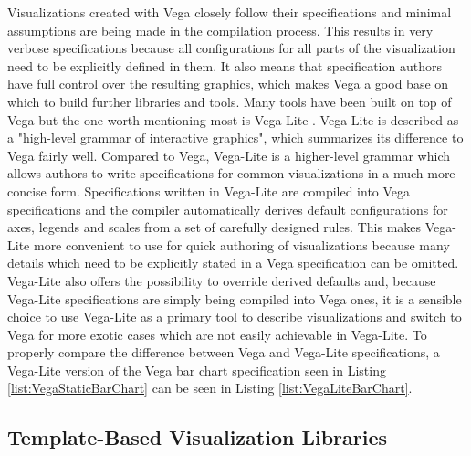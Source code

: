 Visualizations created with Vega closely follow their specifications and minimal assumptions are being made in the compilation process. This results in very verbose specifications because all configurations for all parts of the visualization need to be explicitly defined in them. It also means that specification authors have full control over the resulting graphics, which makes Vega a good base on which to build further libraries and tools. Many tools \parencite{Voyager,Lyra,CompassQL} have been built on top of Vega but the one worth mentioning most is Vega-Lite \parencite{VegaLite}. Vega-Lite is described as a "high-level grammar of interactive graphics", which summarizes its difference to Vega fairly well. Compared to Vega, Vega-Lite is a higher-level grammar which allows authors to write specifications for common visualizations in a much more concise form. Specifications written in Vega-Lite are compiled into Vega specifications and the compiler automatically derives default configurations for axes, legends and scales from a set of carefully designed rules. This makes Vega-Lite more convenient to use for quick authoring of visualizations because many details which need to be explicitly stated in a Vega specification can be omitted. Vega-Lite also offers the possibility to override derived defaults and, because Vega-Lite specifications are simply being compiled into Vega ones, it is a sensible choice to use Vega-Lite as a primary tool to describe visualizations and switch to Vega for more exotic cases which are not easily achievable in Vega-Lite. To properly compare the difference between Vega and Vega-Lite specifications, a Vega-Lite version of the Vega bar chart specification seen in Listing \ref{list:VegaStaticBarChart} can be seen in Listing \ref{list:VegaLiteBarChart}.

\begin{samepage}
 is a Vega-Lite specification of the Vega bar chart specification seen in Listing \ref{list:VegaStaticBarChart} combined with Listing \ref{list:VegaBarChart}.
  },
]{listings/vega-lite-bar-chart.json}
\end{samepage}

\subsection{Template-Based Visualization Libraries}


